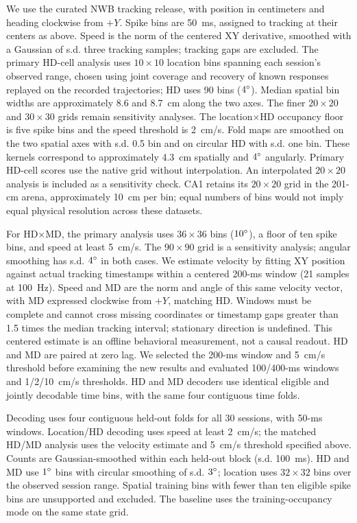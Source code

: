 \documentclass[11pt]{article}
\begin{document}
We use the curated NWB tracking release, with position in centimeters and heading clockwise from $+Y$. Spike bins are 50~ms, assigned to tracking at their centers as above. Speed is the norm of the centered XY derivative, smoothed with a Gaussian of s.d. three tracking samples; tracking gaps are excluded. The primary HD-cell analysis uses $10\times10$ location bins spanning each session's observed range, chosen using joint coverage and recovery of known responses replayed on the recorded trajectories; HD uses 90 bins ($4\degree$). Median spatial bin widths are approximately 8.6 and 8.7~cm along the two axes. The finer $20\times20$ and $30\times30$ grids remain sensitivity analyses. The location$\times$HD occupancy floor is five spike bins and the speed threshold is 2~cm/s. Fold maps are smoothed on the two spatial axes with s.d. 0.5 bin and on circular HD with s.d. one bin. These kernels correspond to approximately 4.3~cm spatially and $4\degree$ angularly. Primary HD-cell scores use the native grid without interpolation. An interpolated $20\times20$ analysis is included as a sensitivity check. CA1 retains its $20\times20$ grid in the 201-cm arena, approximately 10~cm per bin; equal numbers of bins would not imply equal physical resolution across these datasets.

For HD$\times$MD, the primary analysis uses $36\times36$ bins ($10\degree$), a floor of ten spike bins, and speed at least 5~cm/s. The $90\times90$ grid is a sensitivity analysis; angular smoothing has s.d. $4\degree$ in both cases. We estimate velocity by fitting XY position against actual tracking timestamps within a centered 200-ms window (21 samples at 100~Hz). Speed and MD are the norm and angle of this same velocity vector, with MD expressed clockwise from $+Y$, matching HD. Windows must be complete and cannot cross missing coordinates or timestamp gaps greater than 1.5 times the median tracking interval; stationary direction is undefined. This centered estimate is an offline behavioral measurement, not a causal readout. HD and MD are paired at zero lag. We selected the 200-ms window and 5~cm/s threshold before examining the new results and evaluated 100/400-ms windows and 1/2/10~cm/s thresholds. HD and MD decoders use identical eligible and jointly decodable time bins, with the same four contiguous time folds.

Decoding uses four contiguous held-out folds for all 30 sessions, with 50-ms windows. Location/HD decoding uses speed at least 2~cm/s; the matched HD/MD analysis uses the velocity estimate and 5~cm/s threshold specified above. Counts are Gaussian-smoothed within each held-out block (s.d. 100~ms). HD and MD use $1\degree$ bins with circular smoothing of s.d. $3\degree$; location uses $32\times32$ bins over the observed session range. Spatial training bins with fewer than ten eligible spike bins are unsupported and excluded. The baseline uses the training-occupancy mode on the same state grid.
\end{document}
